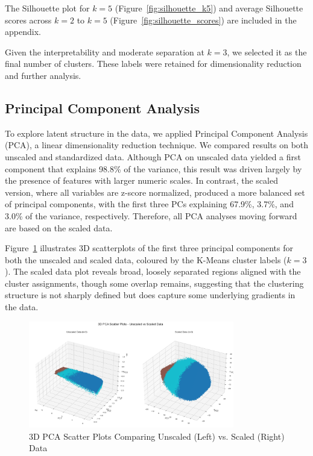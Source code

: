 \documentclass{article}
\begin{document}
The Silhouette plot for $k=5$ (Figure~\ref{fig:silhouette_k5}) and average Silhouette scores across $k=2$ to $k=5$ (Figure~\ref{fig:silhouette_scores}) are included in the appendix.

Given the interpretability and moderate separation at $k=3$, we selected it as the final number of clusters. These labels were retained for dimensionality reduction and further analysis.


\subsection{Principal Component Analysis}

To explore latent structure in the data, we applied Principal Component Analysis (PCA), a linear dimensionality reduction technique. We compared results on both unscaled and standardized data. Although PCA on unscaled data yielded a first component that explains 98.8\% of the variance, this result was driven largely by the presence of features with larger numeric scales. In contrast, the scaled version, where all variables are z-score normalized, produced a more balanced set of principal components, with the first three PCs explaining 67.9\%, 3.7\%, and 3.0\% of the variance, respectively. Therefore, all PCA analyses moving forward are based on the scaled data.

Figure~\ref{fig:pca3d} illustrates 3D scatterplots of the first three principal components for both the unscaled and scaled data, coloured by the K-Means cluster labels ($k=3$). The scaled data plot reveals broad, loosely separated regions aligned with the cluster assignments, though some overlap remains, suggesting that the clustering structure is not sharply defined but does capture some underlying gradients in the data.

\begin{figure}[H]
    \centering
    \includegraphics[width=0.8\textwidth]{figures/pca3d_scaled_vs_unscaled.png}
    \caption{3D PCA Scatter Plots Comparing Unscaled (Left) vs. Scaled (Right) Data}
    \label{fig:pca3d}
\end{figure}
\end{document}
